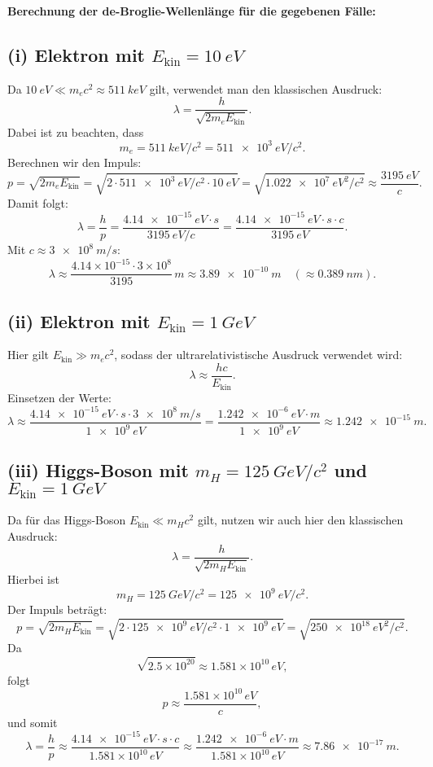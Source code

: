 \documentclass[12pt]{article}
\begin{document}
\vspace{1em}
\textbf{Berechnung der de-Broglie-Wellenlänge für die gegebenen Fälle:}

\subsection*{(i) Elektron mit \(E_{\mathrm{kin}} = \SI{10}{eV}\)}

Da \(\SI{10}{eV} \ll m_e c^2 \approx \SI{511}{keV}\) gilt, verwendet man den klassischen Ausdruck:
\[
\lambda = \frac{h}{\sqrt{2 m_e E_{\mathrm{kin}}}}.
\]
Dabei ist zu beachten, dass
\[
m_e = \SI{511}{keV}/c^2 = \SI{511e3}{eV}/c^2.
\]
Berechnen wir den Impuls:
\[
p = \sqrt{2 m_e E_{\mathrm{kin}}} = \sqrt{2 \cdot \SI{511e3}{eV}/c^2 \cdot \SI{10}{eV}} = \sqrt{\SI{1.022e7}{eV^2}/c^2} \approx \frac{\SI{3195}{eV}}{c}.
\]
Damit folgt:
\[
\lambda = \frac{h}{p} = \frac{\SI{4.14e-15}{eV\cdot s}}{\SI{3195}{eV}/c} 
= \frac{\SI{4.14e-15}{eV\cdot s} \cdot c}{\SI{3195}{eV}}.
\]
Mit \(c \approx \SI{3e8}{m/s}\):
\[
\lambda \approx \frac{4.14 \times 10^{-15} \cdot 3 \times 10^8}{3195} \, \si{m} \approx \SI{3.89e-10}{m} \quad (\approx \SI{0.389}{nm}).
\]

\subsection*{(ii) Elektron mit \(E_{\mathrm{kin}} = \SI{1}{GeV}\)}

Hier gilt \(E_{\mathrm{kin}} \gg m_e c^2\), sodass der ultrarelativistische Ausdruck verwendet wird:
\[
\lambda \approx \frac{h c}{E_{\mathrm{kin}}}.
\]
Einsetzen der Werte:
\[
\lambda \approx \frac{\SI{4.14e-15}{eV\cdot s} \cdot \SI{3e8}{m/s}}{\SI{1e9}{eV}} 
= \frac{\SI{1.242e-6}{eV\cdot m}}{\SI{1e9}{eV}} \approx \SI{1.242e-15}{m}.
\]

\subsection*{(iii) Higgs-Boson mit \(m_H = \SI{125}{GeV}/c^2\) und \(E_{\mathrm{kin}} = \SI{1}{GeV}\)}

Da für das Higgs-Boson \(E_{\mathrm{kin}} \ll m_H c^2\) gilt, nutzen wir auch hier den klassischen Ausdruck:
\[
\lambda = \frac{h}{\sqrt{2 m_H E_{\mathrm{kin}}}}.
\]
Hierbei ist
\[
m_H = \SI{125}{GeV}/c^2 = \SI{125e9}{eV}/c^2.
\]
Der Impuls beträgt:
\[
p = \sqrt{2 m_H E_{\mathrm{kin}}} = \sqrt{2 \cdot \SI{125e9}{eV}/c^2 \cdot \SI{1e9}{eV}} 
= \sqrt{\SI{250e18}{eV^2}/c^2}.
\]
Da
\[
\sqrt{2.5 \times 10^{20}} \approx 1.581 \times 10^{10}\,\si{eV},
\]
folgt
\[
p \approx \frac{1.581 \times 10^{10}\,\si{eV}}{c},
\]
und somit
\[
\lambda = \frac{h}{p} \approx \frac{\SI{4.14e-15}{eV\cdot s}\cdot c}{1.581 \times 10^{10}\,\si{eV}} 
\approx \frac{\SI{1.242e-6}{eV\cdot m}}{1.581 \times 10^{10}\,\si{eV}} \approx \SI{7.86e-17}{m}.
\]
\end{document}
